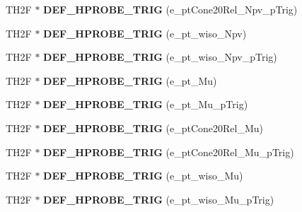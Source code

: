 \begin{DoxyCompactItemize}
\item 
\hypertarget{classHistos__Fake_a77e2d9d98edbb78bf682112bedb3dcde}{
TH2F $\ast$ {\bfseries DEF\_\-HPROBE\_\-TRIG} (e\_\-ptCone20Rel\_\-Npv\_\-pTrig)}
\label{classHistos__Fake_a77e2d9d98edbb78bf682112bedb3dcde}

\item 
\hypertarget{classHistos__Fake_aeb8f8c1461cac4d8fdf6d462348d1d99}{
TH2F $\ast$ {\bfseries DEF\_\-HPROBE\_\-TRIG} (e\_\-pt\_\-wiso\_\-Npv)}
\label{classHistos__Fake_aeb8f8c1461cac4d8fdf6d462348d1d99}

\item 
\hypertarget{classHistos__Fake_a85b08e8b4d4ff4e5425b4369fe8292a8}{
TH2F $\ast$ {\bfseries DEF\_\-HPROBE\_\-TRIG} (e\_\-pt\_\-wiso\_\-Npv\_\-pTrig)}
\label{classHistos__Fake_a85b08e8b4d4ff4e5425b4369fe8292a8}

\item 
\hypertarget{classHistos__Fake_a2b44e014da8edae1ecc83753a5404f04}{
TH2F $\ast$ {\bfseries DEF\_\-HPROBE\_\-TRIG} (e\_\-pt\_\-Mu)}
\label{classHistos__Fake_a2b44e014da8edae1ecc83753a5404f04}

\item 
\hypertarget{classHistos__Fake_a306ba7ad7afd8b9ab30b0968f2c3299a}{
TH2F $\ast$ {\bfseries DEF\_\-HPROBE\_\-TRIG} (e\_\-pt\_\-Mu\_\-pTrig)}
\label{classHistos__Fake_a306ba7ad7afd8b9ab30b0968f2c3299a}

\item 
\hypertarget{classHistos__Fake_aa4554d5307c5e4cbf749f093e695c474}{
TH2F $\ast$ {\bfseries DEF\_\-HPROBE\_\-TRIG} (e\_\-ptCone20Rel\_\-Mu)}
\label{classHistos__Fake_aa4554d5307c5e4cbf749f093e695c474}

\item 
\hypertarget{classHistos__Fake_a5c86f0e5c9893ff587b61913e421b783}{
TH2F $\ast$ {\bfseries DEF\_\-HPROBE\_\-TRIG} (e\_\-ptCone20Rel\_\-Mu\_\-pTrig)}
\label{classHistos__Fake_a5c86f0e5c9893ff587b61913e421b783}

\item 
\hypertarget{classHistos__Fake_a9aa30e27ddb85d11f2714be60f74b8b4}{
TH2F $\ast$ {\bfseries DEF\_\-HPROBE\_\-TRIG} (e\_\-pt\_\-wiso\_\-Mu)}
\label{classHistos__Fake_a9aa30e27ddb85d11f2714be60f74b8b4}

\item 
\hypertarget{classHistos__Fake_a8e1f3678207616c4b051d1bb3e5965eb}{
TH2F $\ast$ {\bfseries DEF\_\-HPROBE\_\-TRIG} (e\_\-pt\_\-wiso\_\-Mu\_\-pTrig)}
\label{classHistos__Fake_a8e1f3678207616c4b051d1bb3e5965eb}


\end{DoxyCompactItemize}
